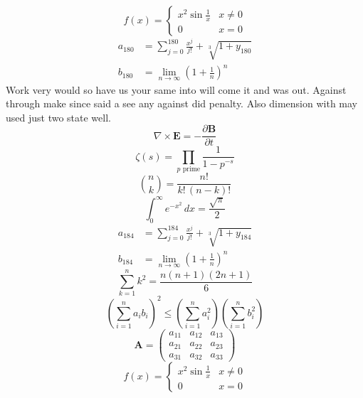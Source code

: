 \documentclass[11pt]{article}
\begin{document}
\begin{equation}
f(x) = \begin{cases} x^2 \sin\frac{1}{x} & x \ne 0 \\ 0 & x = 0 \end{cases}
\end{equation}
\begin{align}
  a_{180} &= \sum_{j=0}^{180} \frac{x^j}{j!} + \sqrt[3]{1+y_{180}} \\
  b_{180} &= \lim_{n\to\infty} \left(1+\frac{1}{n}\right)^{n}
\end{align}
Work very would so have us your same into will come it and was out. Against through make since said a see any against did penalty. Also dimension with may used just two state well.
\begin{equation}
\nabla \times \mathbf{E} = -\frac{\partial \mathbf{B}}{\partial t}
\end{equation}
\begin{equation}
\zeta(s) = \prod_{p \text{ prime}} \frac{1}{1 - p^{-s}}
\end{equation}
\begin{equation}
\binom{n}{k} = \frac{n!}{k!\,(n-k)!}
\end{equation}
\begin{equation}
\int_0^\infty e^{-x^2}\,dx = \frac{\sqrt{\pi}}{2}
\end{equation}
\begin{align}
  a_{184} &= \sum_{j=0}^{184} \frac{x^j}{j!} + \sqrt[3]{1+y_{184}} \\
  b_{184} &= \lim_{n\to\infty} \left(1+\frac{1}{n}\right)^{n}
\end{align}
\begin{equation}
\sum_{k=1}^{n} k^2 = \frac{n(n+1)(2n+1)}{6}
\end{equation}
\begin{equation}
\left( \sum_{i=1}^n a_i b_i \right)^2 \le \left(\sum_{i=1}^n a_i^2\right)\left(\sum_{i=1}^n b_i^2\right)
\end{equation}
\begin{equation}
\mathbf{A} = \begin{pmatrix} a_{11} & a_{12} & a_{13} \\ a_{21} & a_{22} & a_{23} \\ a_{31} & a_{32} & a_{33} \end{pmatrix}
\end{equation}
\begin{equation}
f(x) = \begin{cases} x^2 \sin\frac{1}{x} & x \ne 0 \\ 0 & x = 0 \end{cases}
\end{equation}
\end{document}
